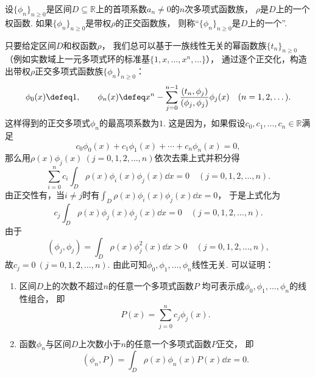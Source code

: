 \begin{definition}
设\(\{\phi_n\}_{n\geq0}\)是区间\(D \subseteq \mathbb{R}\)上的首项系数\(a_n\neq0\)的\(n\)次多项式函数族，
\(\rho\)是\(D\)上的一个权函数.
如果\(\{\phi_n\}_{n\geq0}\)是带权\(\rho\)的正交函数族，
则称“\(\{\phi_n\}_{n\geq0}\)是\(D\)上的一个”.
\end{definition}

只要给定区间\(D\)和权函数\(\rho\)，
我们总可以基于一族线性无关的幂函数族\(\{t_n\}_{n\geq0}\)
（例如实数域上一元多项式环的标准基\(\{1,x,\dotsc,x^n,\dotsc\}\)），
通过逐个正交化，构造出带权\(\rho\)正交多项式函数族\(\{\phi_n\}_{n\geq0}\)：\begin{equation*}
	\phi_0(x) \defeq 1,
	\qquad
	\phi_n(x) \defeq x^n - \sum_{j=0}^{n-1} \frac{
			(
				t_n,
				\phi_j
			)
		}{
			(
				\phi_j,
				\phi_j
			)
		}
		\phi_j(x)
	\quad(n=1,2,\dotsc).
\end{equation*}
这样得到的正交多项式\(\phi_n\)的最高项系数为\(1\).
这是因为，如果假设\(c_0,c_1,\dotsc,c_n \in \mathbb{R}\)满足\begin{equation*}
	c_0 \phi_0(x) + c_1 \phi_1(x) + \dotsb + c_n \phi_n(x) = 0,
\end{equation*}
那么用\(\rho(x) \phi_j(x)\ (j=0,1,2,\dotsc,n)\)依次去乘上式并积分得\begin{equation*}
	\sum_{i=0}^n c_i \int_D \rho(x) \phi_i(x) \phi_j(x) \dd{x} = 0
	\quad(j=0,1,2,\dotsc,n).
\end{equation*}
由正交性有，当\(i \neq j\)时有\(\int_D \rho(x) \phi_i(x) \phi_j(x) \dd{x} = 0\)，
于是上式化为\begin{equation*}
	c_j \int_D \rho(x) \phi_j(x) \phi_j(x) \dd{x} = 0
	\quad(j=0,1,2,\dotsc,n).
\end{equation*}
由于\begin{equation*}
	(\phi_j,\phi_j)
	= \int_D \rho(x) \phi_j^2(x) \dd{x}
	> 0
	\quad(j=0,1,2,\dotsc,n),
\end{equation*}
故\(c_j = 0\ (j=0,1,2,\dotsc,n)\).
由此可知\(\phi_0,\phi_1,\dotsc,\phi_n\)线性无关.
可以证明：
\begin{enumerate}
	\item 区间\(D\)上的次数不超过\(n\)的任意一个多项式函数\(P\)
	均可表示成\(\phi_0,\phi_1,\dotsc,\phi_n\)的线性组合，
	即\begin{equation*}
		P(x) = \sum_{j=0}^n c_j \phi_j(x).
	\end{equation*}

	\item 函数\(\phi_n\)与区间\(D\)上次数小于\(n\)的任意一个多项式函数\(P\)正交，
	即\begin{equation*}
		(\phi_n,P)
		= \int_D \rho(x) \phi_n(x) P(x) \dd{x}
		= 0.
	\end{equation*}
\end{enumerate}

